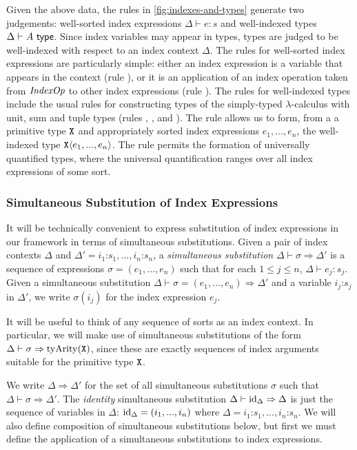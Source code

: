 Given the above data, the rules in \autoref{fig:indexes-and-types}
generate two judgements: well-sorted index expressions $\Delta \vdash
e : s$ and well-indexed types $\Delta \vdash A \textsf{ type}$. Since index
variables may appear in types, types are judged to be well-indexed
with respect to an index context $\Delta$. The rules for well-sorted
index expressions are particularly simple: either an index expression
is a variable that appears in the context (rule ), or it
is an application of an index operation taken from $\mathit{IndexOp}$ to
other index expressions (rule ). The rules for
well-indexed types include the usual rules for constructing types of
the simply-typed $\lambda$-calculus with unit, sum and tuple types
(rules , ,  and
). The rule  allows us to form, from a
a primitive type $\texttt{X}$ and appropriately sorted index
expressions $e_1,...,e_n$, the well-indexed type
$\texttt{X}\langle e_1,...,e_n \rangle$. The rule  permits the
formation of universally quantified types, where the universal
quantification ranges over all index expressions of some sort.

\subsubsection{Simultaneous Substitution of Index Expressions}
\label{sec:simultaneous-substitution}

It will be technically convenient to express substitution of index
expressions in our framework in terms of simultaneous substitutions.
Given a pair of index contexts $\Delta$ and $\Delta' = i_1 \mathord:
s_1, ..., i_n \mathord: s_n$, a \emph{simultaneous substitution}
$\Delta \vdash \sigma \Rightarrow \Delta'$ is a sequence of
expressions $\sigma = (e_1,...,e_n)$ such that for each $1 \leq j \leq
n$, $\Delta \vdash e_j : s_j$. Given a simultaneous substitution
$\Delta \vdash \sigma = (e_1,...,e_n) \Rightarrow \Delta'$ and a
variable $i_j \mathord: s_j$ in $\Delta'$, we write $\sigma(i_j)$ for
the index expression $e_j$.

It will be useful to think of any sequence of sorts as an index
context. In particular, we will make use of simultaneous substitutions
of the form $\Delta \vdash \sigma \Rightarrow
\mathrm{tyArity}(\texttt{X})$, since these are exactly sequences of
index arguments suitable for the primitive type $\texttt{X}$.

We write $\Delta \Rightarrow \Delta'$ for the set of all simultaneous
substitutions $\sigma$ such that $\Delta \vdash \sigma \Rightarrow
\Delta'$. The \emph{identity} simultaneous substitution $\Delta \vdash
\mathrm{id}_\Delta \Rightarrow \Delta$ is just the sequence of variables in
$\Delta$: $\mathrm{id}_\Delta = (i_1,...,i_n)$ where $\Delta =
i_1\mathord:s_1,...,i_n\mathord:s_n$. We will also define composition
of simultaneous substitutions below, but first we must define the
application of a simultaneous substitutions to index expressions.


